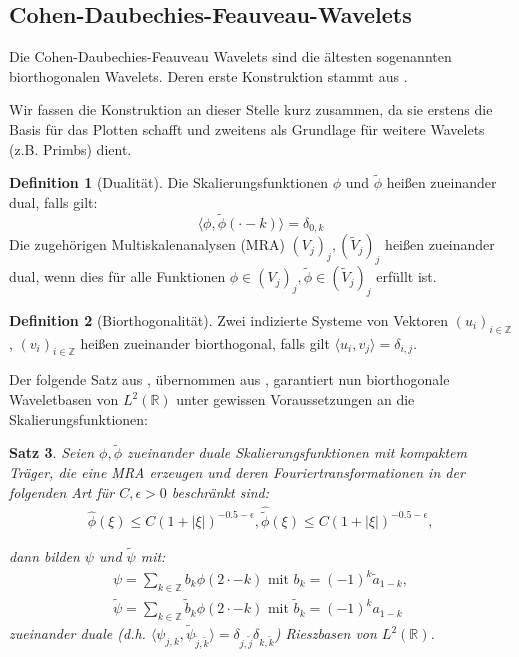 \documentclass[11pt,a4paper,titlepage]{article}
\theoremstyle{plain} %
\newtheorem{satz}{Satz}[section] %
\newcommand{\skalar}[2]{\langle #1, #2\rangle}
\theoremstyle{definition} %
\newtheorem{definition}[satz]{Definition}
\numberwithin{equation}{section} %
\begin{document}
		\subsection{Cohen-Daubechies-Feauveau-Wavelets}
		Die Cohen-Daubechies-Feauveau Wavelets sind die ältesten sogenannten biorthogonalen Wavelets. Deren erste Konstruktion stammt aus \cite{CohenDaubechiesFeauveau}. 
		
		Wir fassen die Konstruktion an dieser Stelle kurz zusammen, da sie erstens die Basis für das Plotten schafft und zweitens als Grundlage für weitere Wavelets (z.B. Primbs) dient.
				
		\begin{definition} [Dualität]
			Die Skalierungsfunktionen $\phi$ und $\tilde{\phi}$ heißen zueinander dual, falls gilt: 
			\begin{equation}
				\skalar{\phi}{\tilde{\phi}(\cdot - k)}=\delta_{0,k}
			\end{equation} 
			Die zugehörigen Multiskalenanalysen (MRA) $(V_j)_j, (\tilde{V}_j)_j$ heißen zueinander dual, wenn dies für alle Funktionen $\phi \in (V_j)_j, \tilde{\phi} \in (\tilde{V}_j)_j$ erfüllt ist.
		\end{definition} 
		
		\begin{definition}[Biorthogonalität]
			Zwei indizierte Systeme von Vektoren $(u_i)_{i\in \mathbb{Z}}$, $(v_i)_{i\in \mathbb{Z}}$ heißen zueinander biorthogonal, falls gilt $\skalar{u_i}{v_j}=\delta_{i,j}$.
		\end{definition}
		
		Der folgende Satz aus \cite{CohenDaubechiesFeauveau}, übernommen aus \cite{Primbs2006}, garantiert nun biorthogonale Waveletbasen von $L^2(\mathbb{R})$ unter gewissen Voraussetzungen an die Skalierungsfunktionen:
		
		\begin{satz}
			Seien $\phi, \tilde{\phi}$ zueinander duale Skalierungsfunktionen mit kompaktem Träger, die eine MRA erzeugen und deren Fouriertransformationen in der folgenden Art für $C,\epsilon>0$ beschränkt sind: 
			\begin{align}
			\hat{\phi}(\xi)\leq C(1+|\xi|)^{-0.5-\epsilon}, \hat{\tilde{\phi}}(\xi)\leq C(1+|\xi|)^{-0.5-\epsilon}, 
			\end{align}
			
			dann bilden $\psi$ und $\tilde{\psi}$ mit:
				\begin{align}
				\label{cdfWavelets}
				\psi = \sum_{k\in \mathbb{Z}}b_k \phi(2\cdot-k) \text{ mit } b_k=(-1)^k \tilde{a}_{1-k},\\
				\tilde{\psi} = \sum_{k\in \mathbb{Z}}\tilde{b}_k \phi(2\cdot-k) \text{ mit } \tilde{b}_k=(-1)^k a_{1-k}
				\end{align}
			zueinander duale  (d.h. $\skalar{\psi_{j,k}}{\tilde{\psi}_{\tilde{j},\tilde{k}}}=\delta_{j,\tilde{j}}\delta_{k,\tilde{k}}$) Rieszbasen von $L^2(\mathbb{R})$.
		\end{satz}
		
\end{document}
